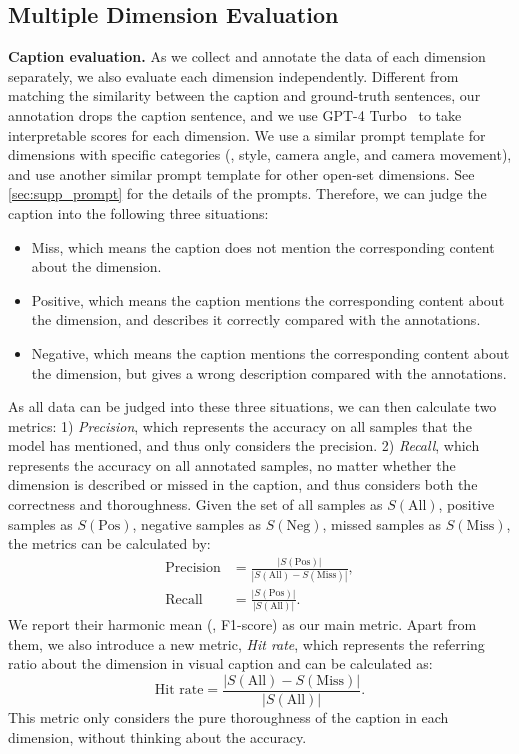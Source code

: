 \subsection{Multiple Dimension Evaluation}
\noindent\textbf{Caption evaluation.}
As we collect and annotate the data of each dimension separately, we also evaluate each dimension independently.
Different from matching the similarity between the caption and ground-truth sentences, our annotation drops the caption sentence, and we use GPT-4 Turbo~\cite{gpt4} to take interpretable scores for each dimension. We use a similar prompt template for dimensions with specific categories (\ie, style, camera angle, and camera movement), and use another similar prompt template for other open-set dimensions. See \cref{sec:supp_prompt} for the details of the prompts. Therefore, we can judge the caption into the following three situations: 
\begin{itemize}
    \item Miss, which means the caption does not mention the corresponding content about the dimension.
    \item Positive, which means the caption mentions the corresponding content about the dimension, and describes it correctly compared with the annotations.
    \item Negative, which means the caption mentions the corresponding content about the dimension, but gives a wrong description compared with the annotations.
\end{itemize}
As all data can be judged into these three situations, we can then calculate two metrics: 
1) \textit{Precision}, which represents the accuracy on all samples that the model has mentioned, and thus only considers the precision. 2) \textit{Recall}, which represents the accuracy on all annotated samples, no matter whether the dimension is described or missed in the caption, and thus considers both the correctness and thoroughness. Given the set of all samples as $S(\text{All})$, positive samples as $S(\text{Pos})$, negative samples as $S(\text{Neg})$, missed samples as $S(\text{Miss})$, the metrics can be calculated by:
\begin{align}
    \text{Precision} &= \frac{|S(\text{Pos})|}{|S(\text{All}) - S(\text{Miss})|}, \\
    \text{Recall} &= \frac{|S(\text{Pos})|}{|S(\text{All})|}.
\end{align}
We report their harmonic mean (\ie, F1-score) as our main metric. Apart from them, we also introduce a new metric, \textit{Hit rate}, which represents the referring ratio about the dimension in visual caption and can be calculated as:
\begin{equation}
    \text{Hit rate} = \frac{|S(\text{All}) - S(\text{Miss})|}{|S(\text{All})|}.
\end{equation}
This metric only considers the pure thoroughness of the caption in each dimension, without thinking about the accuracy.

